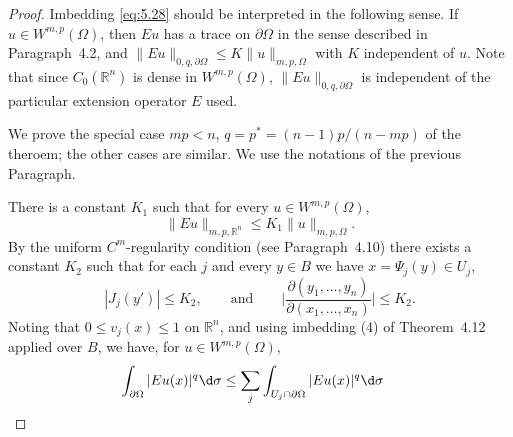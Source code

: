 \begin{proof}
  Imbedding \eqref{eq:5.28} should be interpreted in the following sense.
  If $u\in W^{m,p}(\Omega)$, then $Eu$ has a trace on $\partial\Omega$
  in the sense described in Paragraph~4.2, and $\|Eu\|_{0,q,\partial\Omega}
  \leq K \|u\|_{m,p,\Omega}$ with $K$ independent of $u$. Note that
  since $C_0(\mathbb{R}^n)$ is dense in $W^{m,p}(\Omega)$,
  $\|Eu\|_{0,q,\partial\Omega}$ is independent of the particular extension
  operator $E$ used.

  We prove the special case $mp<n$, $q=p^* = (n-1)p/(n-mp)$ of the theroem;
  the other cases are similar. We use the notations of the previous Paragraph.

  There is a constant $K_1$ such that for every $u\in W^{m,p}(\Omega)$,
  \[ \|Eu\|_{m,p,\mathbb{R}^n} \leq K_1 \|u\|_{m,p,\Omega}. \]
  By the uniform $C^m$-regularity condition (see Paragraph~4.10)
  there exists a constant $K_2$ such that for each $j$ and every $y\in B$
  we have $x = \Psi_j(y) \in U_j$,
  \[ |J_j(y')| \leq K_2, \qquad \text{and} \qquad
      \biggl|\frac{\partial(y_1,\ldots,y_n)}{\partial(x_1,\ldots,x_n)}\biggr| \leq K_2. \]
  Noting that $0\leq v_j(x) \leq 1$ on $\mathbb{R}^n$, and using
  imbedding (4) of Theorem~4.12 applied over $B$, we have, for $u\in W^{m,p}(\Omega)$,
  \begin{align*}
    \int_{\partial\Omega} |Eu(x)|^q \d\sigma
    & \leq \sum_j \int_{U_j \cap \partial\Omega} |Eu(x)|^q \d\sigma
  \end{align*}
\end{proof}